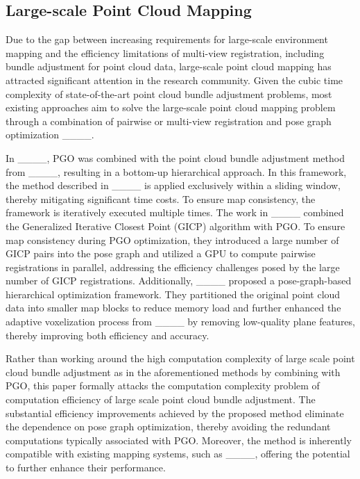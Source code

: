 \subsection{Large-scale Point Cloud Mapping}
Due to the gap between increasing requirements for large-scale environment mapping and the efficiency limitations of multi-view registration, including bundle adjustment for point cloud data, large-scale point cloud mapping has attracted significant attention in the research community.
Given the cubic time complexity of state-of-the-art point cloud bundle adjustment problems, most existing approaches aim to solve the large-scale point cloud mapping problem through a combination of pairwise or multi-view registration and pose graph optimization ____.

In ____, PGO was combined with the point cloud bundle adjustment method from ____, resulting in a bottom-up hierarchical approach. In this framework, the method described in ____ is applied exclusively within a sliding window, thereby mitigating significant time costs. To ensure map consistency, the framework is iteratively executed multiple times.
The work in ____ combined the Generalized Iterative Closest Point (GICP) algorithm with PGO. To ensure map consistency during PGO optimization, they introduced a large number of GICP pairs into the pose graph and utilized a GPU to compute pairwise registrations in parallel, addressing the efficiency challenges posed by the large number of GICP registrations.
Additionally, ____ proposed a pose-graph-based hierarchical optimization framework. They partitioned the original point cloud data into smaller map blocks to reduce memory load and further enhanced the adaptive voxelization process from ____ by removing low-quality plane features, thereby improving both efficiency and accuracy.

{Rather than working around the high computation complexity of large scale point cloud bundle adjustment as in the aforementioned methods by combining with PGO, this paper formally attacks the computation complexity problem of computation efficiency of large scale point cloud bundle adjustment. The substantial efficiency improvements achieved by the proposed method eliminate the dependence on pose graph optimization, thereby avoiding the redundant computations typically associated with PGO. Moreover, the method is inherently compatible with existing mapping systems, such as ____, offering the potential to further enhance their performance.}
